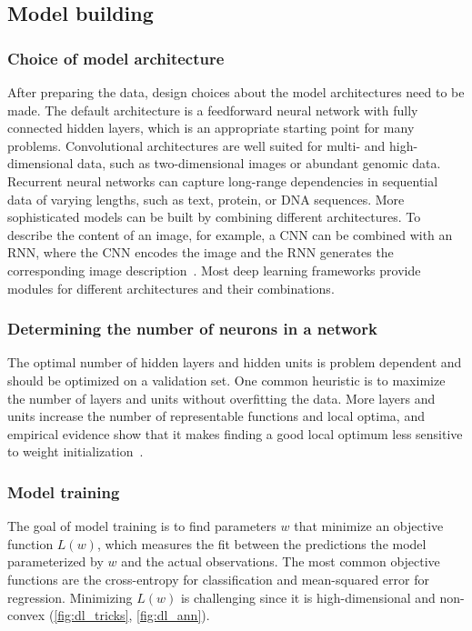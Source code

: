 \subsection{Model building}

\subsubsection{Choice of model architecture}
After preparing the data, design choices about the model architectures need to be made. The default architecture is a feedforward neural network with fully connected hidden layers, which is an appropriate starting point for many problems. Convolutional architectures are well suited for multi- and high-dimensional data, such as two-dimensional images or abundant genomic data. Recurrent neural networks can capture long-range dependencies in sequential data of varying lengths, such as text, protein, or DNA sequences. More sophisticated models can be built by combining different architectures. To describe the content of an image, for example, a CNN can be combined with an RNN, where the CNN encodes the image and the RNN generates the corresponding image description~\citep{vinyals_show_2015,xu_ask_2015}. Most deep learning frameworks provide modules for different architectures and their combinations.

\subsubsection{Determining the number of neurons in a network}
The optimal number of hidden layers and hidden units is problem dependent and should be optimized on a validation set. One common heuristic is to maximize the number of layers and units without overfitting the data. More layers and units increase the number of representable functions and local optima, and empirical evidence show that it makes finding a good local optimum less sensitive to weight initialization~\citep{dauphin_identifying_2014}.

\subsubsection{Model training}
The goal of model training is to find parameters $w$ that minimize an objective function $L(w)$, which measures the fit between the predictions the model parameterized by $w$ and the actual observations. The most common objective functions are the cross-entropy for classification and mean-squared error for regression. Minimizing $L(w)$ is challenging since it is high-dimensional and non-convex (\autoref{fig:dl_tricks}, \autoref{fig:dl_ann}).

